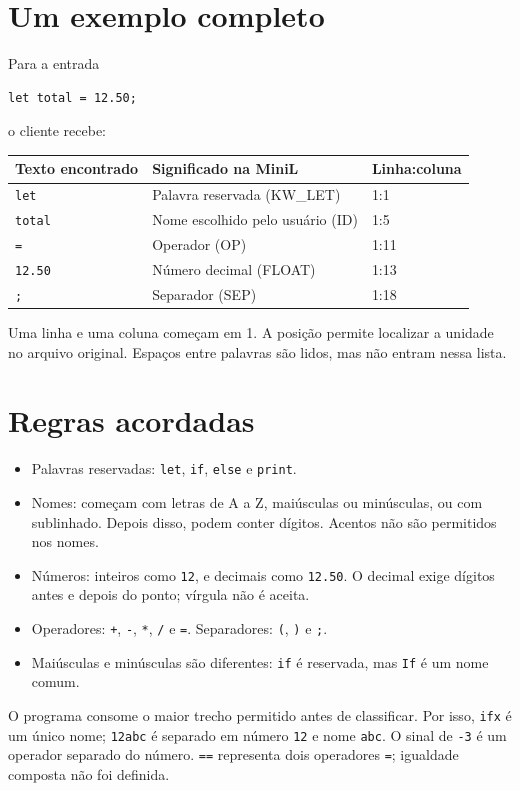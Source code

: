 \documentclass[12pt,a4paper]{article}
\begin{document}
\newpage
\section{Um exemplo completo}
Para a entrada
\begin{lstlisting}[language={}]
let total = 12.50;
\end{lstlisting}
o cliente recebe:
\begin{center}
\begin{tabular}{lll}
\toprule Texto encontrado & Significado na MiniL & Linha:coluna\\\midrule
\texttt{let} & Palavra reservada (KW\_LET) & 1:1\\
\texttt{total} & Nome escolhido pelo usuário (ID) & 1:5\\
\texttt{=} & Operador (OP) & 1:11\\
\texttt{12.50} & Número decimal (FLOAT) & 1:13\\
\texttt{;} & Separador (SEP) & 1:18\\\bottomrule
\end{tabular}
\end{center}
Uma linha e uma coluna começam em 1. A posição permite localizar a unidade
no arquivo original. Espaços entre palavras são lidos, mas não entram nessa lista.

\section{Regras acordadas}
\begin{itemize}
\item Palavras reservadas: \texttt{let}, \texttt{if}, \texttt{else} e \texttt{print}.
\item Nomes: começam com letras de A a Z, maiúsculas ou minúsculas, ou com
sublinhado. Depois disso, podem conter dígitos. Acentos não são permitidos nos nomes.
\item Números: inteiros como \texttt{12}, e decimais como \texttt{12.50}.
O decimal exige dígitos antes e depois do ponto; vírgula não é aceita.
\item Operadores: \texttt{+}, \texttt{-}, \texttt{*}, \texttt{/} e \texttt{=}.
Separadores: \texttt{(}, \texttt{)} e \texttt{;}.
\item Maiúsculas e minúsculas são diferentes: \texttt{if} é reservada,
mas \texttt{If} é um nome comum.
\end{itemize}
O programa consome o maior trecho permitido antes de classificar. Por isso,
\texttt{ifx} é um único nome; \texttt{12abc} é separado em número \texttt{12}
e nome \texttt{abc}. O sinal de \texttt{-3} é um operador separado do número.
\texttt{==} representa dois operadores \texttt{=}; igualdade composta não foi definida.
\end{document}
